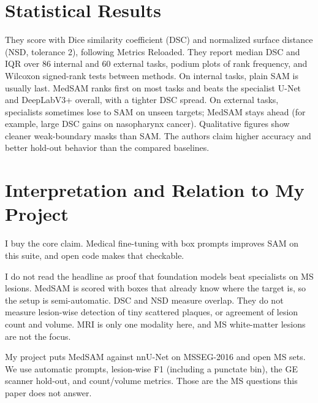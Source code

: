 \documentclass[10pt]{article}
\begin{document}
\section*{Statistical Results}
They score with Dice similarity coefficient (DSC) and normalized surface distance (NSD, tolerance 2), following Metrics Reloaded. They report median DSC and IQR over 86 internal and 60 external tasks, podium plots of rank frequency, and Wilcoxon signed-rank tests between methods. On internal tasks, plain SAM is usually last. MedSAM ranks first on most tasks and beats the specialist U-Net and DeepLabV3+ overall, with a tighter DSC spread. On external tasks, specialists sometimes lose to SAM on unseen targets; MedSAM stays ahead (for example, large DSC gains on nasopharynx cancer). Qualitative figures show cleaner weak-boundary masks than SAM. The authors claim higher accuracy and better hold-out behavior than the compared baselines.

\section*{Interpretation and Relation to My Project}
I buy the core claim. Medical fine-tuning with box prompts improves SAM on this suite, and open code makes that checkable.

I do not read the headline as proof that foundation models beat specialists on MS lesions. MedSAM is scored with boxes that already know where the target is, so the setup is semi-automatic. DSC and NSD measure overlap. They do not measure lesion-wise detection of tiny scattered plaques, or agreement of lesion count and volume. MRI is only one modality here, and MS white-matter lesions are not the focus.

My project puts MedSAM against nnU-Net on MSSEG-2016 and open MS sets. We use automatic prompts, lesion-wise F1 (including a punctate bin), the GE scanner hold-out, and count/volume metrics. Those are the MS questions this paper does not answer.
\end{document}
